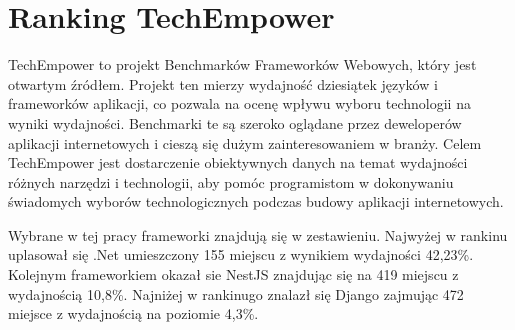 \section{Ranking TechEmpower}

TechEmpower \cite{techempowerTechEmpowerFramework} to projekt Benchmarków Frameworków Webowych, który jest otwartym źródłem.
Projekt ten mierzy wydajność dziesiątek języków i frameworków aplikacji, co pozwala na ocenę wpływu wyboru technologii na wyniki wydajności.
Benchmarki te są szeroko oglądane przez deweloperów aplikacji internetowych i cieszą się dużym zainteresowaniem w branży.
Celem TechEmpower jest dostarczenie obiektywnych danych na temat wydajności różnych narzędzi i technologii, aby pomóc programistom w dokonywaniu świadomych wyborów technologicznych podczas budowy aplikacji internetowych.

Wybrane w tej pracy frameworki znajdują się w zestawieniu.
Najwyżej w rankinu uplasował się .Net umieszczony 155 miejscu z wynikiem wydajności 42,23\%.
Kolejnym frameworkiem okazał sie NestJS znajdując się na 419 miejscu z wydajnością 10,8\%.
Najniżej w rankinugo znalazł się Django zajmując 472 miejsce z wydajnością na poziomie 4,3\%. 